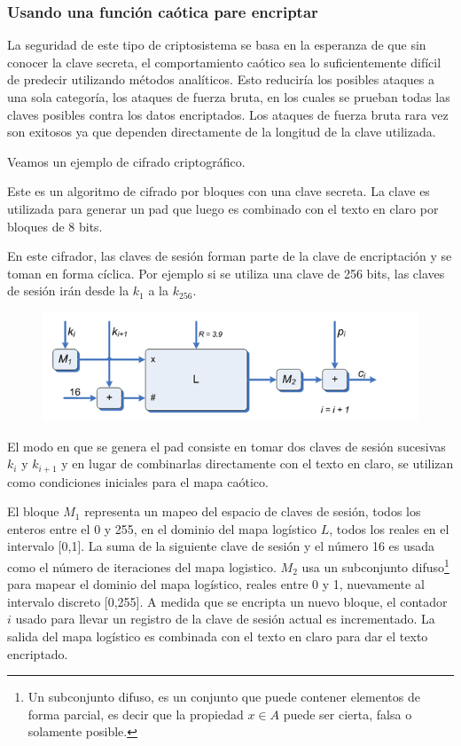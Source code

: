 \subsubsection{Usando una función caótica pare encriptar}
La seguridad de este tipo de criptosistema se basa en la esperanza de que sin conocer la clave secreta, el comportamiento caótico sea lo suficientemente difícil de predecir utilizando métodos analíticos. Esto reduciría los posibles ataques a una sola categoría, los ataques de fuerza bruta, en los cuales se prueban todas las claves posibles contra los datos encriptados. Los ataques de fuerza bruta rara vez son exitosos ya que dependen directamente de la longitud de la clave utilizada.

Veamos un ejemplo de cifrado criptográfico.

\begin{example}
Este es un algoritmo de cifrado por bloques con una clave secreta. La clave es utilizada para generar un pad que luego es combinado con el texto en claro por bloques de 8 bits.

En este cifrador, las claves de sesión forman parte de la clave de encriptación y se toman en forma cíclica. Por ejemplo si se utiliza una clave de 256 bits, las claves de sesión irán desde la $k_1$ a la $k_{256}$.

\begin{figure}[H]
\centering
\includegraphics[width = \textwidth]{img/cifradoCaotico.png}
\end{figure}

El modo en que se genera el pad consiste en tomar dos claves de sesión sucesivas $k_i$ y $k_{i+1}$ y en lugar de combinarlas directamente con el texto en claro, se utilizan como condiciones iniciales para el mapa caótico.

El bloque $M_1$ representa un mapeo del espacio de claves de sesión, todos los enteros entre el 0 y 255, en el dominio del mapa logístico $L$, todos los reales en el intervalo [0,1]. La suma de la siguiente clave de sesión y el número 16 es usada como el número de iteraciones del mapa logistico. $M_2$ usa un subconjunto difuso\footnote{Un subconjunto difuso, es un conjunto que puede contener elementos de forma parcial, es decir que la propiedad  $x\in A$ puede ser cierta, falsa o solamente posible.} para mapear el dominio del mapa logístico, reales entre 0 y 1, nuevamente al intervalo discreto [0,255]. A medida que se encripta un nuevo bloque, el contador $i$ usado para llevar un registro de la clave de sesión actual es incrementado. La salida del mapa logístico es combinada con el texto en claro para dar el texto encriptado.


\end{example}

